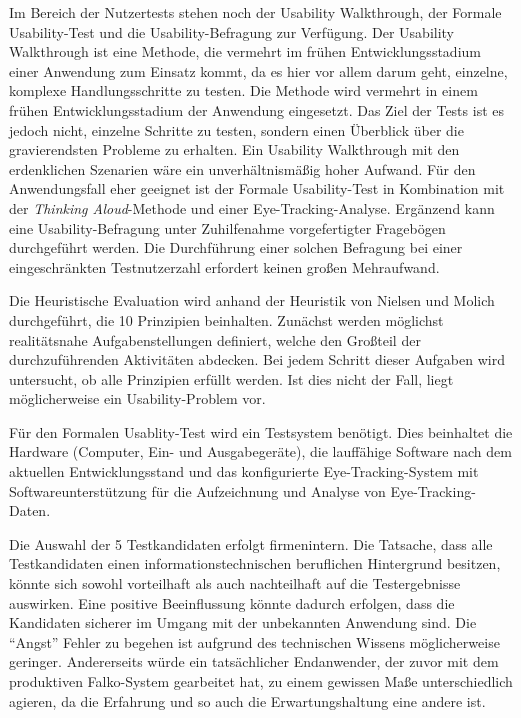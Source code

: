 Im Bereich der Nutzertests stehen noch der Usability Walkthrough, der Formale Usability-Test und die Usability-Befragung zur Verfügung. Der Usability Walkthrough ist eine Methode, die vermehrt im frühen Entwicklungsstadium einer Anwendung zum Einsatz kommt, da es hier vor allem darum geht, einzelne, komplexe Handlungsschritte zu testen. Die Methode wird vermehrt in einem frühen Entwicklungsstadium der Anwendung eingesetzt. Das Ziel der Tests ist es jedoch nicht, einzelne Schritte zu testen, sondern einen Überblick über die gravierendsten Probleme zu erhalten. Ein Usability Walkthrough mit den erdenklichen Szenarien wäre ein unverhältnismäßig hoher Aufwand. Für den Anwendungsfall eher geeignet ist der Formale Usability-Test in Kombination mit der \textit{Thinking Aloud}-Methode und einer Eye-Tracking-Analyse. Ergänzend kann eine Usability-Befragung unter Zuhilfenahme vorgefertigter Fragebögen durchgeführt werden. Die Durchführung einer solchen Befragung bei einer eingeschränkten Testnutzerzahl erfordert keinen großen Mehraufwand.\par
{}
Die Heuristische Evaluation wird anhand der Heuristik von Nielsen und Molich durchgeführt, die 10 Prinzipien beinhalten. Zunächst werden möglichst realitätsnahe Aufgabenstellungen definiert, welche den Großteil der durchzuführenden Aktivitäten abdecken. Bei jedem Schritt dieser Aufgaben wird untersucht, ob alle Prinzipien erfüllt werden. Ist dies nicht der Fall, liegt möglicherweise ein Usability-Problem vor.\par
{}\par
{}
Für den Formalen Usablity-Test wird ein Testsystem benötigt. Dies beinhaltet die Hardware (Computer, Ein- und Ausgabegeräte), die lauffähige Software nach dem aktuellen Entwicklungsstand und das konfigurierte Eye-Tracking-System mit Softwareunterstützung für die Aufzeichnung und Analyse von Eye-Tracking-Daten.%
\par
Die Auswahl der 5 Testkandidaten erfolgt firmenintern. Die Tatsache, dass alle Testkandidaten einen informationstechnischen beruflichen Hintergrund besitzen, könnte sich sowohl vorteilhaft als auch nachteilhaft auf die Testergebnisse auswirken. Eine positive Beeinflussung könnte dadurch erfolgen, dass die Kandidaten sicherer im Umgang mit der unbekannten Anwendung sind. Die \enquote{Angst} Fehler zu begehen ist aufgrund des technischen Wissens möglicherweise geringer. Andererseits würde ein tatsächlicher Endanwender, der zuvor mit dem produktiven Falko-System gearbeitet hat, zu einem gewissen Maße unterschiedlich agieren, da die Erfahrung und so auch die Erwartungshaltung eine andere ist.\par
